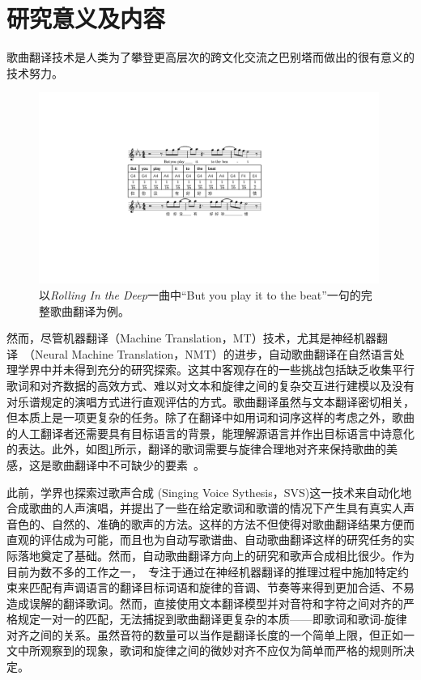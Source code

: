 \section{研究意义及内容}
歌曲翻译技术是人类为了攀登更高层次的跨文化交流之巴别塔而做出的很有意义的技术努力。
\begin{figure}[htbp]
  \includegraphics[width=0.99\textwidth]{figure/ast/exp.pdf}
  \caption{以\textit{Rolling In the Deep}一曲中``But you play it to the beat''一句的完整歌曲翻译为例。}
  \label{fig:task_exp}
\end{figure}
然而，尽管机器翻译（Machine Translation，MT）技术，尤其是神经机器翻译~\citep{nmt, vaswani2017attention, hassan2018achieving}（Neural Machine Translation，NMT）的进步，自动歌曲翻译在自然语言处理学界中并未得到充分的研究探索。这其中客观存在的一些挑战包括缺乏收集平行歌词和对齐数据的高效方式、难以对文本和旋律之间的复杂交互进行建模以及没有对乐谱规定的演唱方式进行直观评估的方式。歌曲翻译虽然与文本翻译密切相关，但本质上是一项更复杂的任务。除了在翻译中如用词和词序这样的考虑之外，歌曲的人工翻译者还需要具有目标语言的背景，能理解源语言并作出目标语言中诗意化的表达。此外，如图\ref{fig:task_exp}所示，翻译的歌词需要与旋律合理地对齐来保持歌曲的美感，这是歌曲翻译中不可缺少的要素~\citep{three_d_of_singability}。

此前，学界也探索过歌声合成 (Singing Voice Sythesis，SVS)这一技术来自动化地合成歌曲的人声演唱，并提出了一些在给定歌词和歌谱的情况下产生具有真实人声音色的、自然的、准确的歌声的方法。这样的方法不但使得对歌曲翻译结果方便而直观的评估成为可能，而且也为自动写歌谱曲、自动歌曲翻译这样的研究任务的实际落地奠定了基础。然而，自动歌曲翻译方向上的研究和歌声合成相比很少。作为目前为数不多的工作之一，~\citet{gagast}专注于通过在神经机器翻译的推理过程中施加特定约束来匹配有声调语言的翻译目标词语和旋律的音调、节奏等来得到更加合适、不易造成误解的翻译歌词。然而，\citet{gagast}直接使用文本翻译模型并对音符和字符之间对齐的严格规定一对一的匹配，无法捕捉到歌曲翻译更复杂的本质——即歌词和歌词-旋律对齐之间的关系。虽然音符的数量可以当作是翻译长度的一个简单上限，但正如\citet{interplay_lyrics_melody}一文中所观察到的现象，歌词和旋律之间的微妙对齐不应仅为简单而严格的规则所决定。


